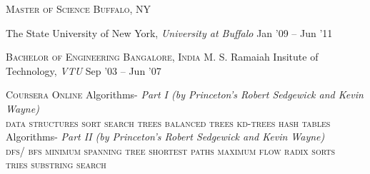 \documentclass[10pt,a4paper]{article} %
\begin{document}
\spacedhrule{0.5em}{-0.4em} %

\headedsection %
{\textsc{Master of Science}}
{\textsc{Buffalo, NY}} {

  \headedsubsection %
	{The State University of New York, \textit{University at Buffalo}} 
	{Jan '09 -- Jun '11} {}
}


\headedsection %
{\textsc{Bachelor of Engineering}}
{\textsc{Bangalore, India}} {
  \headedsubsection %
  {M. S. Ramaiah Insitute of Technology, \textit{VTU}}
  {Sep '03 -- Jun '07} {}
}


\headedsection %
{\textsc{Coursera}} {\textsc{Online}} {
  \headedsubsection %
  {Algorithms- \textit{Part I (by Princeton's Robert Sedgewick and Kevin Wayne)}}
  {} {
	\\
	\bull \textsc{data structures} \bull \textsc{sort} \bull \textsc{search} \bull \textsc{trees} \bull \textsc{balanced trees} \bull \textsc{kd-trees} \bull \textsc{hash tables}
  }
  \headedsubsection %
  {Algorithms- \textit{Part II (by Princeton's Robert Sedgewick and Kevin Wayne)}}
  {} {
	\\
  	\bull \textsc{dfs/ bfs \bull minimum spanning tree \bull shortest paths
	\bull maximum flow \bull radix sorts\\
	\bull tries  \bull substring search}
  }
}

\spacedhrule{0.5em}{-0.4em} %

\end{document}
